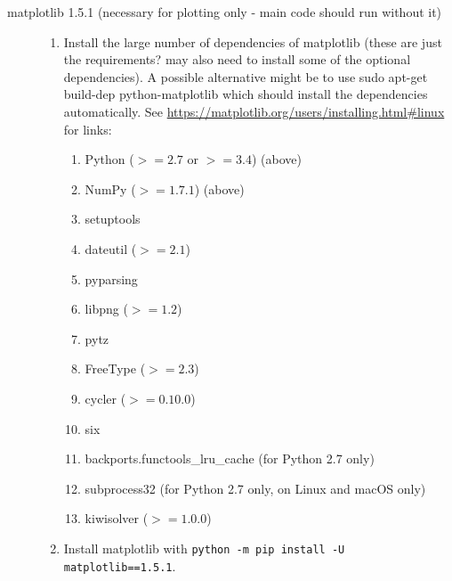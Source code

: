\documentclass{article}
\begin{document}
\begin{description}
\begin{enumerate}
\end{enumerate}
\item[matplotlib 1.5.1 (necessary for plotting only - main code should run without it)] \hfill
\begin{enumerate}
\item Install the large number of dependencies of matplotlib (these are just the requirements? may also need to install some of the optional dependencies). A possible alternative might be to use sudo apt-get build-dep python-matplotlib which should install the dependencies automatically. See \url{https://matplotlib.org/users/installing.html#linux} for links:
\begin{enumerate}
\item	Python ($>= 2.7$ or $>= 3.4$) (above)
\item	NumPy ($>= 1.7.1$) (above)
\item	setuptools
\item	dateutil ($>= 2.1$)
\item	pyparsing
\item	libpng ($>= 1.2$)
\item	pytz
\item	FreeType ($>= 2.3$)
\item	cycler ($>= 0.10.0$)
\item	six
\item	backports.functools\_lru\_cache (for Python 2.7 only)
\item	subprocess32 (for Python 2.7 only, on Linux and macOS only)
\item kiwisolver ($>= 1.0.0$)
\end{enumerate}
\item Install matplotlib with \lstinline[style=bash_input]{python -m pip install -U matplotlib==1.5.1}.
\end{enumerate}
\end{description}
\end{document}
